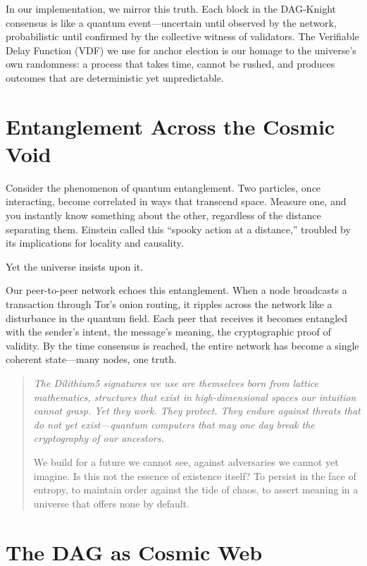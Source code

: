 \documentclass[12pt,a4paper]{article}
\begin{document}
In our implementation, we mirror this truth. Each block in the DAG-Knight consensus is like a quantum event---uncertain until observed by the network, probabilistic until confirmed by the collective witness of validators. The Verifiable Delay Function (VDF) we use for anchor election is our homage to the universe's own randomness: a process that takes time, cannot be rushed, and produces outcomes that are deterministic yet unpredictable.

\section{Entanglement Across the Cosmic Void}

Consider the phenomenon of quantum entanglement. Two particles, once interacting, become correlated in ways that transcend space. Measure one, and you instantly know something about the other, regardless of the distance separating them. Einstein called this ``spooky action at a distance,'' troubled by its implications for locality and causality.

Yet the universe insists upon it.

Our peer-to-peer network echoes this entanglement. When a node broadcasts a transaction through Tor's onion routing, it ripples across the network like a disturbance in the quantum field. Each peer that receives it becomes entangled with the sender's intent, the message's meaning, the cryptographic proof of validity. By the time consensus is reached, the entire network has become a single coherent state---many nodes, one truth.

\begin{quote}
\itshape
The Dilithium5 signatures we use are themselves born from lattice mathematics, structures that exist in high-dimensional spaces our intuition cannot grasp. Yet they work. They protect. They endure against threats that do not yet exist---quantum computers that may one day break the cryptography of our ancestors.

We build for a future we cannot see, against adversaries we cannot yet imagine. Is this not the essence of existence itself? To persist in the face of entropy, to maintain order against the tide of chaos, to assert meaning in a universe that offers none by default.
\end{quote}

\section{The DAG as Cosmic Web}
\end{document}
